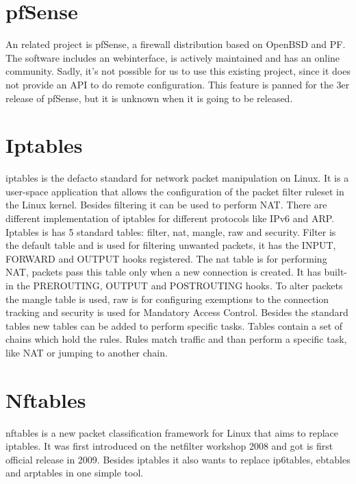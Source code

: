 \documentclass{report}
\begin{document}
\section{pfSense}\label{pfsense}

An related project is pfSense\cite{pfsense}, a firewall distribution based on
OpenBSD and PF. The software includes an webinterface, is actively
maintained and has an online community. Sadly, it's not possible for us
to use this existing project, since it does not provide an API to do
remote configuration. This feature is panned for the 3er release of
pfSense, but it is unknown when it is going to be released.


\section{Iptables}\label{iptables}

iptables\cite{iptables} is the defacto standard for network packet manipulation on
Linux. It is a user-space application that allows the configuration of
the packet filter ruleset in the Linux kernel. Besides filtering it can
be used to perform NAT. There are different implementation of iptables
for different protocols like IPv6 and ARP. Iptables is has 5 standard
tables: filter, nat, mangle, raw and security. Filter is the default
table and is used for filtering unwanted packets, it has the INPUT,
FORWARD and OUTPUT hooks registered. The nat table is for performing
NAT, packets pass this table only when a new connection is created. It
has built-in the PREROUTING, OUTPUT and POSTROUTING hooks. To alter
packets the mangle table is used, raw is for configuring exemptions to
the connection tracking and security is used for Mandatory Access
Control. Besides the standard tables new tables can be added to perform
specific tasks. Tables contain a set of chains which hold the rules.
Rules match traffic and than perform a specific task, like NAT or
jumping to another chain.

\section{Nftables}\label{nftables}

nftables\cite{nftables}\cite{nftables2}\cite{nftables3} is a new packet classification framework for Linux that aims to
replace iptables. It was first introduced on the netfilter workshop 2008
and got is first official release in 2009. Besides iptables it also
wants to replace ip6tables, ebtables and arptables in one simple tool.
\end{document}

